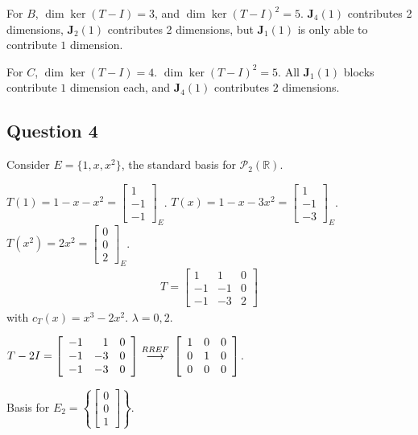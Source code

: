 \documentclass{article}
\newcommand{\matr}[1]{\mathbf{#1}}
\newcommand{\grstep}[2][\relax]{%
   \ensuremath{\mathrel{
       {\mathop{\longrightarrow}\limits^{#2\mathstrut}_{
                                     \begin{subarray}{l} #1 \end{subarray}}}}}}
\begin{document}
For $B$, $\dim \ker (T-I)=3$, and $\dim \ker (T-I)^2=5$. $\matr J_4(1)$ contributes 2 dimensions, $\matr J_2(1)$ contributes 2 dimensions, but $\matr J_1(1)$ is only able to contribute $1$ dimension.

For $C$, $\dim \ker (T-I)=4$. $\dim \ker (T-I)^2=5$. All $\matr J_1(1)$ blocks contribute $1$ dimension each, and $\matr J_4(1)$ contributes $2$ dimensions.

\pagebreak
\subsection*{Question 4}

Consider $E=\{1, x, x^2\}$, the standard basis for $\mathcal P_2(\mathbb{R})$.

$T(1)=1-x-x^2=\left[\begin{array}{r}
 1   \\
 -1  \\
-1
\end{array}\right]_E$. $T(x)=1-x-3x^2=\left[\begin{array}{r}
 1   \\
 -1  \\
-3
\end{array}\right]_E$. $T(x^2)=2x^2= \left[\begin{array}{r}
 0   \\
 0  \\
2
\end{array}\right]_E$.
\begin{align*}
    T= \left[\begin{array}{rrr}
1 & 1 & 0 \\
-1 & -1 & 0 \\
-1 & -3 & 2
\end{array}\right]
\end{align*}
with $c_T(x)=x^3-2x^2$. $\lambda=0, 2$.

$T-2I = \left[\begin{array}{rrr}
-1 & 1 & 0 \\
-1 & -3 & 0 \\
-1 & -3 & 0
\end{array}\right] \grstep{RREF}{} \left[\begin{array}{rrr}
1 & 0 & 0 \\
0 & 1 & 0 \\
0 & 0 & 0
\end{array}\right]$.

Basis for $E_2 = \left\{\left[\begin{array}{r}
0 \\
0 \\
1
\end{array}\right]\right\}$. 
\end{document}
